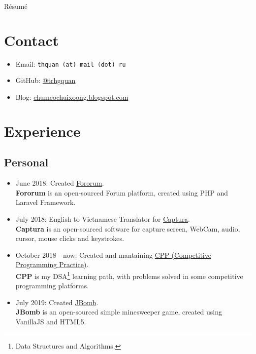 \documentclass{article}
\renewcommand{\maketitle}{
\begin{center}
{\huge\bfseries\theauthor}
\linebreak\linebreak
R\'esum\'e
\end{center}
}
\begin{document}
\author{Quan, Tran Hoang}
\maketitle

\section{Contact}
\begin{itemize}
\item Email: \texttt{thquan (at) mail (dot) ru}
\item GitHub: \href{https://github.com/trhgquan}{@trhgquan}
\item Blog: \href{https://chumeochuixoong.blogspot.com}{chumeochuixoong.blogspot.com}
\end{itemize}

\section{Experience}
\subsection{Personal}
\begin{itemize}
\item June 2018: Created \href{https://github.com/trhgquan/Fororum}{Fororum}.\\
\textbf{Fororum} is an open-sourced Forum platform, created using PHP and Laravel Framework.

\item July 2018: English to Vietnamese Translator for \href{https://github.com/MathewSachin/Captura}{Captura}.\\
\textbf{Captura} is an open-sourced software for capture screen, WebCam, audio, cursor, mouse clicks and keystrokes.

\item October 2018 - now: Created and mantaining \href{https://github.com/trhgquan/CPP}{CPP (Competitive Programming Practice)}.\\
\textbf{CPP} is my DSA\footnote{Data Structures and Algorithms.} learning path, with problems solved in some competitive programming platforms.

\item July 2019: Created \href{https://github.com/trhgquan/JBomb}{JBomb}.\\
\textbf{JBomb} is an open-sourced simple minesweeper game, created using VanillaJS and HTML5.
\end{itemize}
\end{document}
